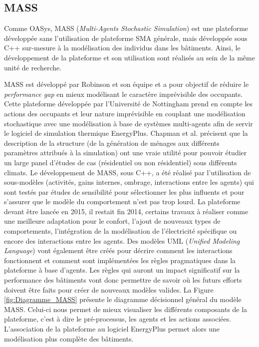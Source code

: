 \subsection{MASS}

Comme OASys, MASS (\textit{Multi-Agents Stochastic Simulation}) est une plateforme développée sans l'utilisation de plateforme SMA générale, mais développée sous C++ sur-mesure à la modélisation des individus dans les bâtiments. Ainsi, le développement de la plateforme et son utilisation sont réalisés au sein de la même unité de recherche.

MASS est développé par Robinson et son équipe et a pour objectif de réduire le \textit{performance gap} en mieux modélisant le caractère imprévisible des occupants. Cette plateforme développée par l'Université de Nottingham prend en compte les actions des occupants et leur nature imprévisible en couplant une modélisation stochastique avec une modélisation à base de systèmes multi-agents afin de servir le logiciel de simulation thermique EnergyPlus. Chapman et al. \cite{Chapman-14} précisent que la description de la structure (de la génération de ménages aux différents paramètres attribués à la simulation) ont une vraie utilité pour pouvoir étudier un large panel d'études de cas (résidentiel ou non résidentiel) sous différents climats. Le développement de MASS, sous C++, a été réalisé par l'utilisation de sous-modèles (activités, gains internes, ombrage, interactions entre les agents) qui sont testés par études de sensibilité pour sélectionner les plus influents et pour s'assurer que le modèle du comportement n'est pas trop lourd. La plateforme devant être lancée en 2015, il restait fin 2014, certains travaux à réaliser comme une meilleure adaptation pour le confort, l'ajout de nouveaux types de comportements, l'intégration de la modélisation de l'électricité spécifique ou encore des interactions entre les agents. Des modèles UML (\textit{Unified Modeling Language}) vont également être créés pour décrire comment les interactions fonctionnent et comment sont implémentées les règles pragmatiques dans la plateforme à base d'agents. Les règles qui auront un impact significatif sur la performance des bâtiments vont donc permettre de savoir où les futurs efforts doivent être faits pour créer de nouveaux modèles valides. La Figure \ref{fig:Diagramme_MASS} présente le diagramme décisionnel général du modèle MASS. Celui-ci nous permet de mieux visualiser les différents composants de la plateforme, c'est à dire le pré-processus, les agents et les actions associées. L'association de la plateforme au logiciel EnergyPlus permet alors une modélisation plus complète des bâtiments.

